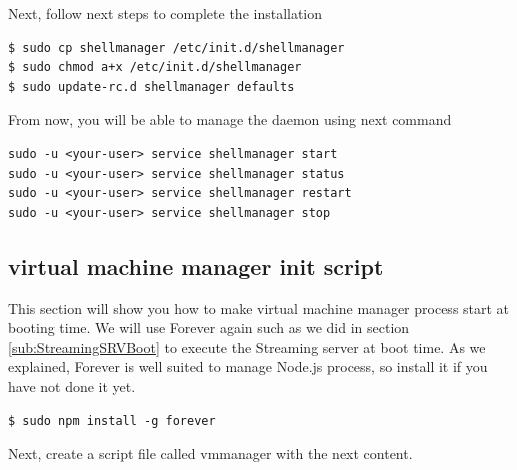 \documentclass{article}
\begin{document}
Next, follow next steps to complete the installation

\begin{verbatim}
$ sudo cp shellmanager /etc/init.d/shellmanager
$ sudo chmod a+x /etc/init.d/shellmanager
$ sudo update-rc.d shellmanager defaults
\end{verbatim}

From now, you will be able to manage the daemon using next command

\begin{verbatim}
sudo -u <your-user> service shellmanager start
sudo -u <your-user> service shellmanager status
sudo -u <your-user> service shellmanager restart
sudo -u <your-user> service shellmanager stop
\end{verbatim}

\subsection{virtual machine manager init script}
\label{sub:VMManagerBoot}
This section will show you how to make virtual machine manager process start at booting time. We will use Forever again such as we did in section \ref{sub:StreamingSRVBoot} to execute the Streaming server at boot time. As we explained, Forever is well suited to manage Node.js process, so install it if you have not done it yet.

\begin{verbatim}
$ sudo npm install -g forever
\end{verbatim}

Next, create a script file called vmmanager with the next content.
\end{document}
